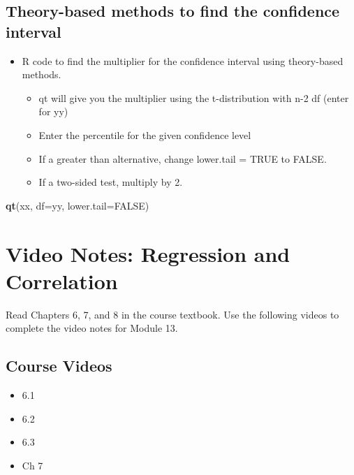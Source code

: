 \documentclass[
]{report}
\newenvironment{Shaded}{\begin{snugshade}}{\end{snugshade}}
\newcommand{\AttributeTok}[1]{\textcolor[rgb]{0.13,0.29,0.53}{#1}}
\newcommand{\ConstantTok}[1]{\textcolor[rgb]{0.56,0.35,0.01}{#1}}
\newcommand{\FunctionTok}[1]{\textcolor[rgb]{0.13,0.29,0.53}{\textbf{#1}}}
\newcommand{\NormalTok}[1]{#1}
\begin{document}
\subsection*{Theory-based methods to find the confidence interval}\label{theory-based-methods-to-find-the-confidence-interval-1}

\begin{itemize}
\item
  R code to find the multiplier for the confidence interval using theory-based methods.

  \begin{itemize}
  \item
    qt will give you the multiplier using the t-distribution with n-2 df (enter for yy)
  \item
    Enter the percentile for the given confidence level
  \item
    If a greater than alternative, change lower.tail = TRUE to FALSE.
  \item
    If a two-sided test, multiply by 2.
  \end{itemize}
\end{itemize}

\begin{Shaded}
\begin{Highlighting}[]
\FunctionTok{qt}\NormalTok{(xx, }\AttributeTok{df=}\NormalTok{yy, }\AttributeTok{lower.tail=}\ConstantTok{FALSE}\NormalTok{)}
\end{Highlighting}
\end{Shaded}

\newpage

\section{Video Notes: Regression and Correlation}\label{video-notes-regression-and-correlation}

Read Chapters 6, 7, and 8 in the course textbook. Use the following videos to complete the video notes for Module 13.

\subsection{Course Videos}\label{course-videos-2}

\begin{itemize}
\item
  6.1
\item
  6.2
\item
  6.3
\item
  Ch 7
\end{itemize}
\end{document}

